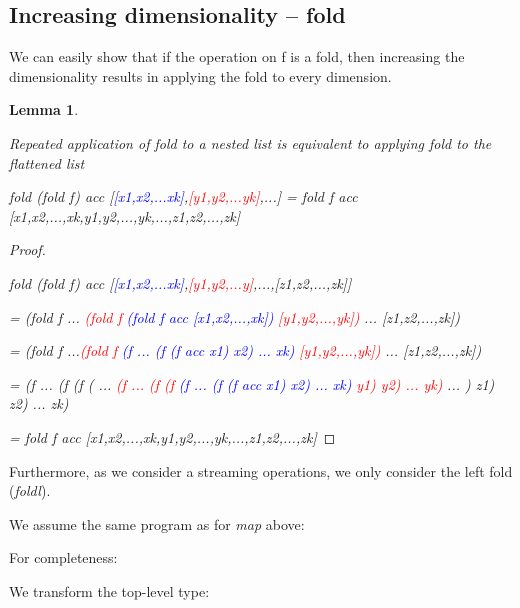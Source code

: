 \documentclass{article}
\newenvironment{lyxcode}
{\par\begin{list}{}{
\setlength{\rightmargin}{\leftmargin}
\setlength{\listparindent}{0pt}\raggedright
\setlength{\itemsep}{0pt}
\setlength{\parsep}{0pt}
\normalfont\ttfamily}\item[]}
{\end{list}}
\newtheorem{lemma}{Lemma}
\begin{document}
\subsection{Increasing dimensionality -- fold}

We can easily show that if the operation on f is a fold, then increasing
the dimensionality results in applying the fold to every dimension. 

\begin{lemma}\label{FoldOnNestedList}

Repeated application of \emph{fold} to a nested list is equivalent
to applying \emph{fold} to the flattened list

\emph{fold (fold f) acc {[}}\textcolor{blue}{\emph{{[}x1,x2,...xk{]}}}\emph{,}\textcolor{red}{\emph{{[}y1,y2,...yk{]}}}\emph{,...{]}
= fold f acc {[}x1,x2,...,xk,y1,y2,...,yk,...,z1,z2,...,zk{]}}

\end{lemma}

\begin{proof}

~

\emph{fold (fold f) acc {[}}\textcolor{blue}{\emph{{[}x1,x2,...xk{]}}}\emph{,}\textcolor{red}{\emph{{[}y1,y2,...y{]}}}\emph{,...,{[}z1,z2,...,zk{]}{]} }

\emph{= (fold f ... }\textcolor{red}{\emph{(fold f}}\emph{ }\textcolor{blue}{\emph{(fold
f acc {[}x1,x2,...,xk{]})}}\emph{ }\textcolor{red}{\emph{{[}y1,y2,...,yk{]})}}\emph{
... {[}z1,z2,...,zk{]})}

\emph{= (fold f ...}\textcolor{red}{\emph{(fold f}}\emph{ }\textcolor{blue}{\emph{(f
... (f (f acc x1) x2) ... xk) }}\textcolor{red}{\emph{{[}y1,y2,...,yk{]})}}\emph{
... {[}z1,z2,...,zk{]})}

\emph{= (f ... (f (f ( ... }\textcolor{red}{\emph{(f ... (f (f}}\emph{
}\textcolor{blue}{\emph{(f ... (f (f acc x1) x2) ... xk)}}\emph{ }\textcolor{red}{\emph{y1)
y2) ... yk)}}\emph{ ... ) z1) z2) ... zk)}

\emph{= fold f acc {[}x1,x2,...,xk,y1,y2,...,yk,...,z1,z2,...,zk{]}}

\end{proof}

Furthermore, as we consider a streaming operations, we only consider
the left fold (\emph{foldl}). 

We assume the same program as for \emph{map} above:
\begin{lyxcode}













\end{lyxcode}
For completeness:
\begin{lyxcode}



\end{lyxcode}
We transform the top-level type:
\end{document}
